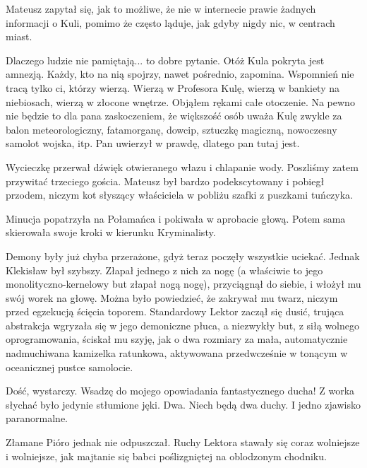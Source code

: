 Mateusz zapytał się, jak to możliwe, że nie w internecie prawie żadnych informacji o Kuli, pomimo że często ląduje, jak gdyby nigdy nic, w centrach miast.
\begin{dialogue}
\ds{} Dlaczego ludzie nie pamiętają... to dobre pytanie.
Otóż Kula pokryta jest amnezją. Każdy, kto na nią spojrzy, nawet pośrednio, zapomina.
Wspomnień nie tracą tylko ci, którzy wierzą. 
Wierzą w Profesora Kulę, wierzą w bankiety na niebiosach, wierzą w złocone wnętrze.
\dm{} Objąłem rękami całe otoczenie. \dm{} 
Na pewno nie będzie to dla pana zaskoczeniem, że większość osób uważa Kulę zwykle za balon meteorologiczny, fatamorganę, dowcip, sztuczkę magiczną, nowoczesny samolot wojska, itp.
Pan uwierzył w prawdę, dlatego pan tutaj jest.
\end{dialogue}

Wycieczkę przerwał dźwięk otwieranego włazu i chlapanie wody.
Poszliśmy zatem przywitać trzeciego gościa. 
Mateusz był bardzo podekscytowany i pobiegł przodem, niczym kot słyszący właściciela w pobliżu szafki z puszkami tuńczyka.

\divider{}

Minucja popatrzyła na Połamańca i pokiwała w aprobacie głową.
Potem sama skierowała swoje kroki w kierunku Kryminalisty.

Demony były już chyba przerażone, gdyż teraz poczęły wszystkie uciekać.
Jednak Klekisław był szybszy. 
Złapał jednego z nich za nogę (a właściwie to jego monolityczno-kernelowy but złapał nogą nogę), przyciągnął do siebie, i włożył mu swój worek na głowę.
Można było powiedzieć, że zakrywał mu twarz, niczym przed egzekucją ścięcia toporem.
Standardowy Lektor zaczął się dusić, trująca abstrakcja wgryzała się w jego demoniczne płuca, a niezwykły but, z siłą wolnego oprogramowania, ściskał mu szyję,
jak o dwa rozmiary za mała, automatycznie nadmuchiwana kamizelka ratunkowa, aktywowana przedwcześnie w tonącym w oceanicznej pustce samolocie. 

\begin{dialogue}
\ds{} Dość, wystarczy. Wsadzę do mojego opowiadania fantastycznego ducha! \dm{} Z worka słychać było jedynie stłumione jęki. \dm{} 
Dwa. Niech będą dwa duchy. I jedno zjawisko paranormalne.
\end{dialogue}

Złamane Pióro jednak nie odpuszczał. Ruchy Lektora stawały się coraz wolniejsze i wolniejsze, jak majtanie się babci poślizgniętej na oblodzonym chodniku.

\divider{}

